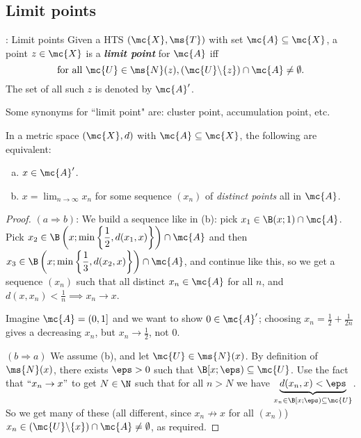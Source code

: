 \subsection{Limit points}
\begin{ndef}{: Limit points}
	Given a HTS \((\mc{X},\ms{T})\) with set \(\mc{A}\subseteq\mc{X}\), a point \(z\in\mc{X}\) is a \emph{\textbf{limit point}} for \(\mc{A}\) iff
	\begin{equation*}
		\text{for all}~\mc{U}\in\ms{N}(z),\left(\mc{U}\backslash\{z\}\right)\cap\mc{A}\neq\emptyset.
	\end{equation*}
	The set of all such \(z\) is denoted by \(\mc{A}'\).
\end{ndef}
\begin{notation}
	Some synonyms for ``limit point" are: cluster point, accumulation point, etc.
\end{notation}
\begin{nlemma}{}
	In a metric space \((\mc{X},d)\) with \(\mc{A}\subseteq\mc{X}\), the following are equivalent:
	\begin{enumerate}[(a)]
		\item \(x\in\mc{A}'\).
		
		\item \(x=\displaystyle\lim_{n\to\infty}x_n\) for some sequence \((x_n)\) of \emph{distinct points} all in \(\mc{A}\).
	\end{enumerate}
\end{nlemma}
\begin{proof}
	\((a\Rightarrow b)\): We build a sequence like in (b): pick \(x_1\in\B(x;1)\cap\mc{A}\). Pick \(x_2\in\B\left(x;\operatorname{min}\left\{\displaystyle\frac{1}{2},d(x_1,x)\right\}\right)\cap \mc{A}\) and then \(x_3\in\B\left(x;\operatorname{min}\left\{\displaystyle\frac{1}{3},d(x_2,x)\right\}\right)\cap\mc{A}\), and continue like this, so we get a sequence \((x_n)\) such that all distinct \(x_n\in\mc{A}\) for all \(n\), and \(d(x,x_n)<\displaystyle\frac{1}{n}\implies x_n\to x\).
	\begin{note}
		Imagine \(\mc{A}=(0,1]\) and we want to show \(0\in\mc{A}'\); choosing \(x_n=\displaystyle\frac{1}{2}+\frac{1}{2n}\) gives a decreasing \(x_n\), but \(x_n\to\displaystyle\frac{1}{2}\), not \(0\).
	\end{note}
	
	\medskip
	
	\((b\Rightarrow a)\) We assume (b), and let \(\mc{U}\in\ms{N}(x)\). By definition of \(\ms{N}(x)\), there exists \(\eps>0\) such that \(\B[x;\eps)\subseteq\mc{U}\). Use the fact that \(``x_n\to x"\) to get \(N\in\N\) such that for all \(n>N\) we have \(\underbrace{d(x_n,x)<\eps}_{x_n\in\B[x;\eps)\subseteq\mc{U}}\). So we get many of these (all different, since \(x_n\not\to x\) for all \((x_n)\)) \(x_n\in(\mc{U}\backslash\{x\})\cap\mc{A}\neq\emptyset\), as required.
\end{proof}
